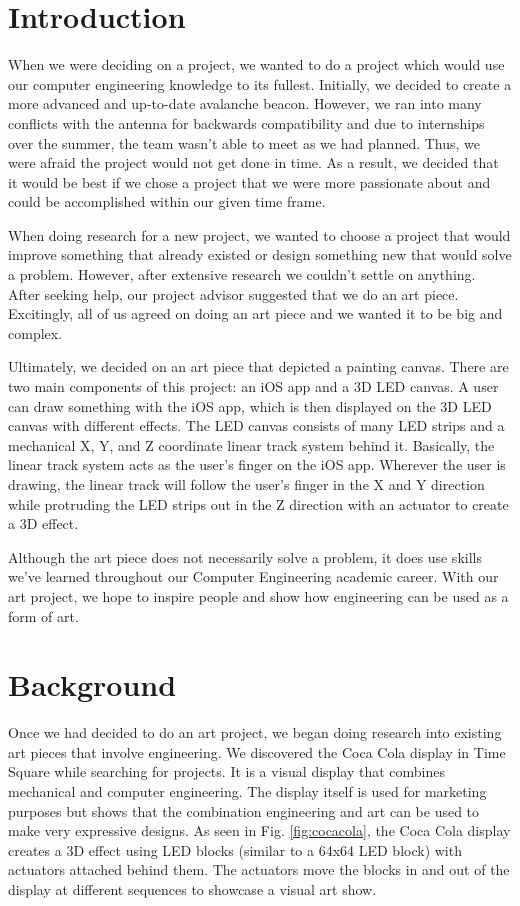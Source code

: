 \documentclass[12pt]{article}
\begin{document}
\section{Introduction}
When we were deciding on a project, we wanted to do a project which would use our computer engineering knowledge to its fullest. Initially, we decided to create a more advanced and up-to-date avalanche beacon. However, we ran into many conflicts with the antenna for backwards compatibility and due to internships over the summer, the team wasn’t able to meet as we had planned. Thus, we were afraid the project would not get done in time. As a result, we decided that it would be best if we chose a project that we were more passionate about and could be accomplished within our given time frame. 

When doing research for a new project, we wanted to choose a project that would improve something that already existed or design something new that would solve a problem. However, after extensive research we couldn’t settle on anything. After seeking help, our project advisor suggested that we do an art piece. Excitingly, all of us agreed on doing an art piece and we wanted it to be big and complex. 

Ultimately, we decided on an art piece that depicted a painting canvas. There are two main components of this project: an iOS app and a 3D LED canvas. A user can draw something with the iOS app, which is then displayed on the 3D LED canvas with different effects. The LED canvas consists of many LED strips and a mechanical X, Y, and Z coordinate linear track system behind it. Basically, the linear track system acts as the user’s finger on the iOS app. Wherever the user is drawing, the linear track will follow the user’s finger in the X and Y direction while protruding the LED strips out in the Z direction with an actuator to create a 3D effect. 

Although the art piece does not necessarily solve a problem, it does use skills we’ve learned throughout our Computer Engineering academic career. With our art project, we hope to inspire people and show how engineering can be used as a form of art.

\section{Background}
Once we had decided to do an art project, we began doing research into existing art pieces that involve engineering. We discovered the  Coca Cola display in Time Square while searching for projects. It is a visual display that combines mechanical and computer engineering. The display itself is used for marketing purposes but shows that the combination engineering and art can be used to make very expressive designs. As seen in Fig. \ref{fig:cocacola}, the Coca Cola display creates a 3D effect using LED blocks (similar to a 64x64 LED block) with actuators attached behind them. The actuators move the blocks in and out of the display at different sequences to showcase a visual art show.
\end{document}
